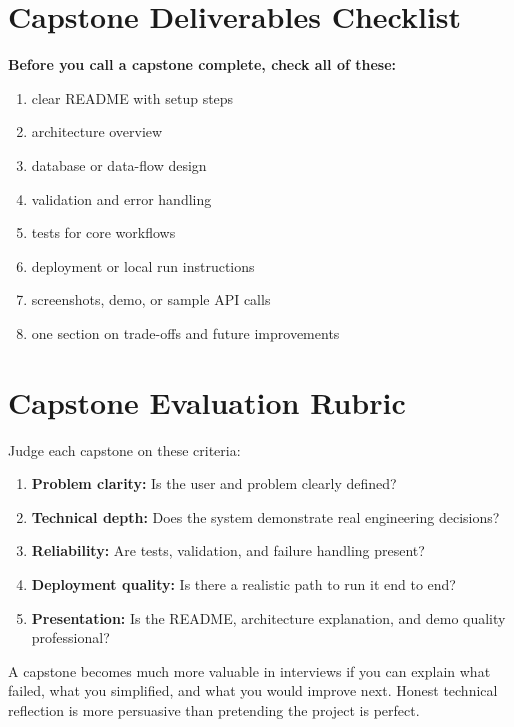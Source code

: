\documentclass[12pt, a4paper, oneside]{book}
\begin{document}
\section{Capstone Deliverables Checklist}

\begin{exercisebox}
\textbf{Before you call a capstone complete, check all of these:}
\begin{enumerate}[leftmargin=2em]
    \item clear README with setup steps
    \item architecture overview
    \item database or data-flow design
    \item validation and error handling
    \item tests for core workflows
    \item deployment or local run instructions
    \item screenshots, demo, or sample API calls
    \item one section on trade-offs and future improvements
\end{enumerate}
\end{exercisebox}

\section{Capstone Evaluation Rubric}

Judge each capstone on these criteria:
\begin{enumerate}[leftmargin=2em]
    \item \textbf{Problem clarity:} Is the user and problem clearly defined?
    \item \textbf{Technical depth:} Does the system demonstrate real engineering decisions?
    \item \textbf{Reliability:} Are tests, validation, and failure handling present?
    \item \textbf{Deployment quality:} Is there a realistic path to run it end to end?
    \item \textbf{Presentation:} Is the README, architecture explanation, and demo quality professional?
\end{enumerate}

\begin{examtipbox}
A capstone becomes much more valuable in interviews if you can explain what failed, what you simplified, and what you would improve next. Honest technical reflection is more persuasive than pretending the project is perfect.
\end{examtipbox}
\end{document}
